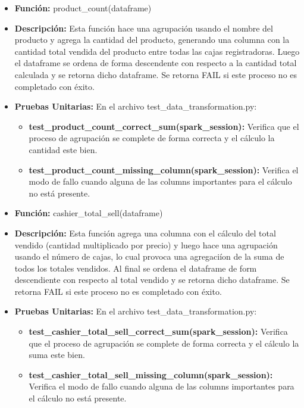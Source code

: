 \documentclass[a4paper]{article}
\begin{document}
\begin{itemize}
        \begin{itemize}
            \item \textbf{Funci\'{o}n:} product\_count(dataframe)
            \item \textbf{Descripci\'{o}n:} Esta funci\'{o}n hace una agrupaci\'{o}n usando el nombre del producto y agrega la cantidad del producto, generando una columna con la cantidad total vendida del producto entre todas las cajas registradoras. Luego el dataframe se ordena de forma descendente con respecto a la cantidad total calculada y se retorna dicho dataframe. Se retorna FAIL si este proceso no es completado con \'{e}xito.
            \item \textbf{Pruebas Unitarias:} En el archivo test\_data\_transformation.py:
                \begin{itemize}
                    \item \textbf{test\_product\_count\_correct\_sum(spark\_session):} Verifica que el proceso de agrupaci\'{o}n se complete de forma correcta y el c\'{a}lculo la cantidad este bien.
                    \item \textbf{test\_product\_count\_missing\_column(spark\_session):} Verifica el modo de fallo cuando alguna de las columns importantes para el c\'{a}lculo no est\'{a} presente.
                \end{itemize}
        \end{itemize}

        \begin{itemize}
            \item \textbf{Funci\'{o}n:} cashier\_total\_sell(dataframe)
            \item \textbf{Descripci\'{o}n:} Esta funci\'{o}n agrega una columna con el c\'{a}lculo del total vendido (cantidad multiplicado por precio) y luego hace una agrupaci\'{o}n usando el n\'{u}mero de cajas, lo cual provoca una agregaci\'{i}on de la suma de todos los totales vendidos. Al final se ordena el dataframe de form descendiente con respecto al total vendido y se retorna dicho dataframe. Se retorna FAIL si este proceso no es completado con \'{e}xito.
            \item \textbf{Pruebas Unitarias:} En el archivo test\_data\_transformation.py:
                \begin{itemize}
                    \item \textbf{test\_cashier\_total\_sell\_correct\_sum(spark\_session):} Verifica que el proceso de agrupaci\'{o}n se complete de forma correcta y el c\'{a}lculo la suma este bien.
                    \item \textbf{test\_cashier\_total\_sell\_missing\_column(spark\_session):} Verifica el modo de fallo cuando alguna de las columns importantes para el c\'{a}lculo no est\'{a} presente.
                \end{itemize}
        \end{itemize}
    
\end{itemize}
\end{document}
